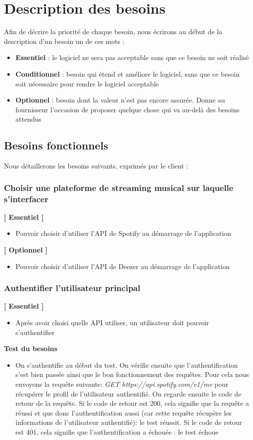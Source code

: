 \documentclass{article}
\begin{document}
		\section{Description des besoins} \label{besoins}
		Afin de décrire la priorité de chaque besoin, nous écrirons au début de la description d'un besoin un de ces mots :
		\begin{itemize}
			\item \textbf{Essentiel} : le logiciel ne sera pas acceptable sans que ce besoin ne soit réalisé
			\item \textbf{Conditionnel} : besoin qui étend et améliore le logiciel, sans que ce besoin soit nécessaire pour rendre le logiciel acceptable
			\item \textbf{Optionnel} : besoin dont la valeur n’est pas encore assurée. Donne au fournisseur l’occasion de proposer quelque chose qui va au-delà des besoins attendus
		\end{itemize}
		\subsection{Besoins fonctionnels}
		Nous détaillerons les besoins suivants, exprimés par le client :
		\subsubsection{Choisir une plateforme de streaming musical sur laquelle s'interfacer}
		\textbf{[ Essentiel ]}
		\begin{itemize}
			\item Pouvoir choisir d'utiliser l'API de Spotify au démarrage de l'application
		\end{itemize}
		\textbf{[ Optionnel ]}
		\begin{itemize}
			\item Pouvoir choisir d'utiliser l'API de Deezer au démarrage de l'application
		\end{itemize}
		\subsubsection{Authentifier l'utilisateur principal} \label{authentification}
		\textbf{[ Essentiel ]}
		\begin{itemize}
			\item Après avoir choisi quelle API utiliser, un utilisateur doit pouvoir s'authentifier
		\end{itemize}
		\textbf{Test du besoins} 
		\begin{itemize}
			\item On s'authentifie au début du test. On vérifie ensuite que l'authentification s'est bien passée ainsi que le bon fonctionnement des requêtes. Pour cela nous envoyons la requête suivante: \textit{GET https://api.spotify.com/v1/me} pour récupérer le profil de l'utilisateur authentifié. On regarde ensuite le code de retour de la requête. Si le code de retour est 200, cela signifie que la requête a réussi et que donc l'authentification aussi (car cette requête récupère les informations de l'utilisateur authentifié): le test réussit. Si le code de retour est 401, cela signifie que l'authentification a échouée : le test échoue
		\end{itemize}
		\newpage
\end{document}
